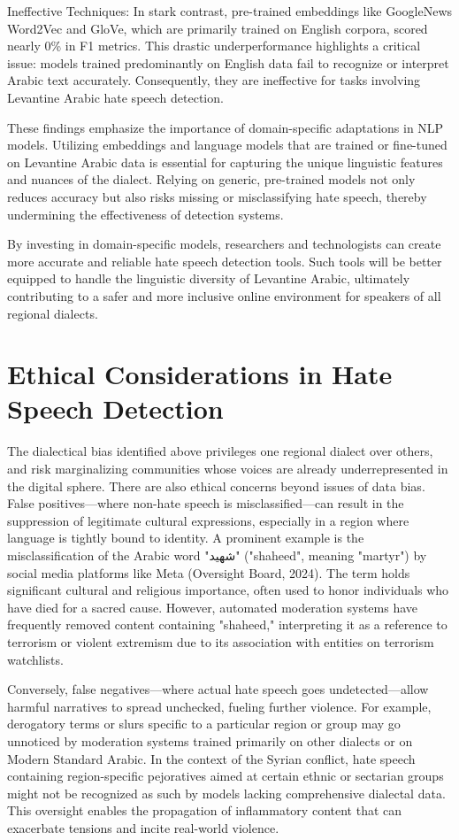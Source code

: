 \documentclass[11pt]{article}
\begin{document}
Ineffective Techniques: In stark contrast, pre-trained embeddings like GoogleNews Word2Vec and GloVe, which are primarily trained on English corpora, scored nearly 0\% in F1 metrics. This drastic underperformance highlights a critical issue: models trained predominantly on English data fail to recognize or interpret Arabic text accurately. Consequently, they are ineffective for tasks involving Levantine Arabic hate speech detection.

These findings emphasize the importance of domain-specific adaptations in NLP models. Utilizing embeddings and language models that are trained or fine-tuned on Levantine Arabic data is essential for capturing the unique linguistic features and nuances of the dialect. Relying on generic, pre-trained models not only reduces accuracy but also risks missing or misclassifying hate speech, thereby undermining the effectiveness of detection systems.

By investing in domain-specific models, researchers and technologists can create more accurate and reliable hate speech detection tools. Such tools will be better equipped to handle the linguistic diversity of Levantine Arabic, ultimately contributing to a safer and more inclusive online environment for speakers of all regional dialects.


\section{Ethical Considerations in Hate Speech Detection}
The dialectical bias identified above privileges one regional dialect over others, and risk marginalizing communities whose voices are already underrepresented in the digital sphere. There are also ethical concerns beyond issues of data bias. False positives—where non-hate speech is misclassified—can result in the suppression of legitimate cultural expressions, especially in a region where language is tightly bound to identity. A prominent example is the misclassification of the Arabic word "شهيد" ("shaheed", meaning "martyr") by social media platforms like Meta (Oversight Board, 2024). The term holds significant cultural and religious importance, often used to honor individuals who have died for a sacred cause. However, automated moderation systems have frequently removed content containing "shaheed," interpreting it as a reference to terrorism or violent extremism due to its association with entities on terrorism watchlists. 

Conversely, false negatives—where actual hate speech goes undetected—allow harmful narratives to spread unchecked, fueling further violence. For example, derogatory terms or slurs specific to a particular region or group may go unnoticed by moderation systems trained primarily on other dialects or on Modern Standard Arabic. In the context of the Syrian conflict, hate speech containing region-specific pejoratives aimed at certain ethnic or sectarian groups might not be recognized as such by models lacking comprehensive dialectal data. This oversight enables the propagation of inflammatory content that can exacerbate tensions and incite real-world violence.
\end{document}
